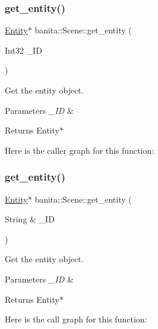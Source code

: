 \subsubsection{\texorpdfstring{get\_entity()}{get\_entity()}\hspace{0.1cm}{\footnotesize\ttfamily [1/2]}}
{\footnotesize\ttfamily \mbox{\hyperlink{classbanita_1_1_entity}{Entity}}$\ast$ banita\+::\+Scene\+::get\+\_\+entity (\begin{DoxyParamCaption}\item[{Int32}]{\+\_\+\+ID }\end{DoxyParamCaption})\hspace{0.3cm}{\ttfamily [inline]}}



Get the entity object. 


\begin{DoxyParams}{Parameters}
{\em \+\_\+\+ID} & \\
\hline
\end{DoxyParams}
\begin{DoxyReturn}{Returns}
Entity$\ast$ 
\end{DoxyReturn}
Here is the caller graph for this function\+:
\mbox{\label{classbanita_1_1_scene_a9acedd39a5c861b803818635c355a81f}} 
\subsubsection{\texorpdfstring{get\_entity()}{get\_entity()}\hspace{0.1cm}{\footnotesize\ttfamily [2/2]}}
{\footnotesize\ttfamily \mbox{\hyperlink{classbanita_1_1_entity}{Entity}}$\ast$ banita\+::\+Scene\+::get\+\_\+entity (\begin{DoxyParamCaption}\item[{String \&}]{\+\_\+\+ID }\end{DoxyParamCaption})\hspace{0.3cm}{\ttfamily [inline]}}



Get the entity object. 


\begin{DoxyParams}{Parameters}
{\em \+\_\+\+ID} & \\
\hline
\end{DoxyParams}
\begin{DoxyReturn}{Returns}
Entity$\ast$ 
\end{DoxyReturn}
Here is the call graph for this function\+:
\mbox{\label{classbanita_1_1_scene_adaa0e0879b6714fe1932562f6088892c}} 
